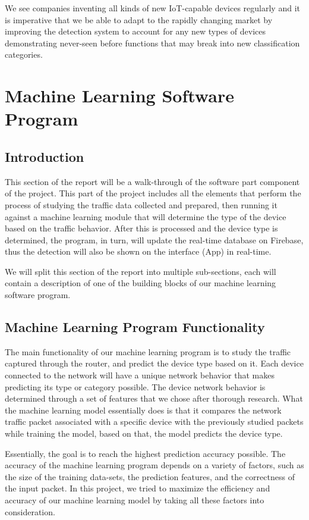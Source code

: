\documentclass{article}
\begin{document}
We see companies inventing all kinds of new IoT-capable devices
regularly and it is imperative that we be able to adapt to the rapidly
changing market by improving the detection system to account for any new
types of devices demonstrating never-seen before functions that may
break into new classification categories.

\pagebreak

\section{Machine Learning Software Program}
\subsection{Introduction}
This section of the report will be a walk-through of the software part component of the project. This part of the project includes all the elements that perform the process of studying the traffic data collected and prepared, then running it against a machine learning module that will determine the type of the device based on the traffic behavior. After this is processed and the device type is determined, the program, in turn, will update the real-time database on Firebase, thus the detection will also be shown on the interface (App) in real-time.\newline

We will split this section of the report into multiple sub-sections, each will contain a description of one of the building blocks of our machine learning software program.

\subsection{Machine Learning Program Functionality}
The main functionality of our machine learning program is to study the traffic captured through the router, and predict the device type based on it. Each device connected to the network will have a unique network behavior that makes predicting its type or category possible. The device network behavior is determined through a set of features that we chose after thorough research. What the machine learning model essentially does is that it compares the network traffic packet associated with a specific device with the previously studied packets while training the model, based on that, the model predicts the device type.\pagebreak 

Essentially, the goal is to reach the highest prediction accuracy possible. The accuracy of the machine learning program depends on a variety of factors, such as the size of the training data-sets, the prediction features, and the correctness of the input packet. In this project, we tried to maximize the efficiency and accuracy of our machine learning model by taking all these factors into consideration.\newline
\end{document}
